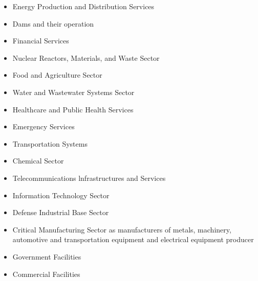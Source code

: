 \begin{itemize}
	\item Energy Production and Distribution Services
	\item Dams and their operation
	\item Financial Services
	\item Nuclear Reactors, Materials, and Waste Sector
	\item Food and Agriculture Sector
	\item Water and Wastewater Systems Sector
	\item Healthcare and Public Health Services
	\item Emergency Services
	\item Transportation Systems
	\item Chemical Sector
	\item Telecommunications lnfrastructures and Services
	\item Information Technology Sector
	\item Defense Industrial Base Sector
	\item Critical Manufacturing Sector as manufacturers of metals, machinery,
automotive and transportation equipment and electrical equipment
producer
	\item Government Facilities
	\item Commercial Facilities
\end{itemize}

